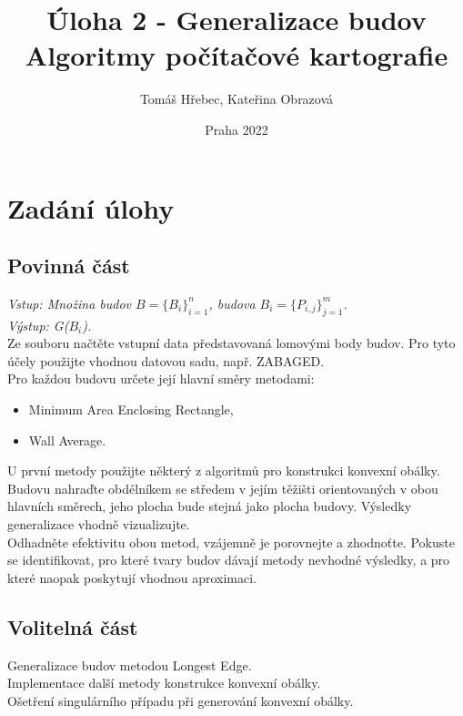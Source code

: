 \documentclass{article}
\title{%
   \Large{Úloha 2 - Generalizace budov} \\
  \large{Algoritmy počítačové kartografie}}
\author{Tomáš Hřebec, Kateřina Obrazová}
\date{Praha 2022}
\begin{document}
\doublespacing
\maketitle

\section{\large{Zadání úlohy}}
\subsection{\small{Povinná část}}
\justifying
\textit{Vstup: Množina budov $B = \{B_{i}\}_{i=1}^n$, budova $B_{i} = \{P_{i,j}\}_{j=1}^m$.}
\vspace{0.2cm}\\
\textit{Výstup: G($B_{i}$).}
\vspace{0.2cm}\\
Ze souboru načtěte vstupní data představovaná lomovými body budov. Pro tyto účely použijte vhodnou datovou sadu, např. ZABAGED.
\vspace{0.2cm}\\
Pro každou budovu určete její hlavní směry metodami:
\begin{itemize}
    \item Minimum Area Enclosing Rectangle,
    \item Wall Average.
\end{itemize}
U první metody použijte některý z algoritmů pro konstrukci konvexní obálky. Budovu nahraďte obdélníkem se středem v jejím těžišti orientovaných v obou hlavních směrech, jeho plocha bude stejná jako plocha budovy. Výsledky generalizace vhodně vizualizujte.
\vspace{0.2cm}\\
Odhadněte efektivitu obou metod, vzájemně je porovnejte a zhodnoťte. Pokuste se identifikovat, pro které tvary budov dávají metody nevhodné výsledky, a pro které naopak poskytují vhodnou aproximaci.
\subsection{\small{Volitelná část}}
Generalizace budov metodou Longest Edge.
\vspace{0.2cm}\\
Implementace další metody konstrukce konvexní obálky.
\vspace{0.2cm}\\
Ošetření singulárního případu při generování konvexní obálky.
\clearpage
\newpage
\end{document}
